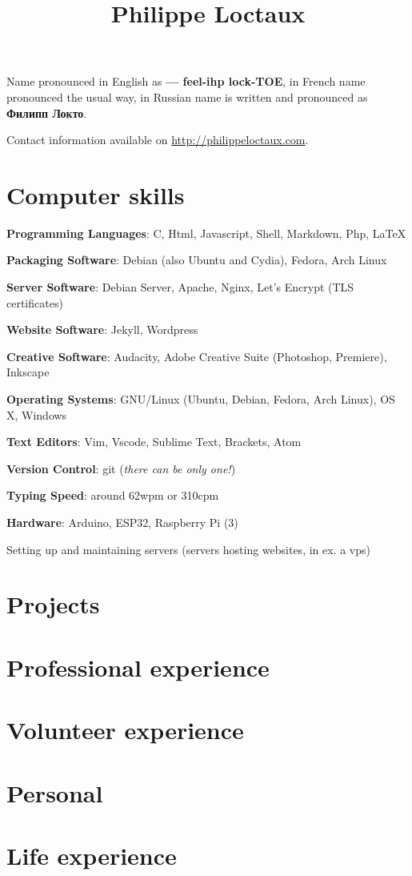 \documentclass[a4paper]{article}
\title{Philippe Loctaux}
\date{\vspace{-5ex}}
\begin{document}
\maketitle

Name pronounced in English as \textbf{ — feel-ihp lock-TOE}, in French name pronounced the usual way, in Russian name is written and pronounced as \textbf{Филипп Локто}.

Contact information available on \url{http://philippeloctaux.com}.

\section*{Computer skills}

\begin{description}
	\item \textbf{Programming Languages}: C, Html, Javascript, Shell, Markdown, Php, \LaTeX
	\item \textbf{Packaging Software}: Debian (also Ubuntu and Cydia), Fedora, Arch Linux
	\item \textbf{Server Software}: Debian Server, Apache, Nginx, Let's Encrypt (TLS certificates)
	\item \textbf{Website Software}: Jekyll, Wordpress
	\item \textbf{Creative Software}: Audacity, Adobe Creative Suite (Photoshop, Premiere), Inkscape
	\item \textbf{Operating Systems}: GNU/Linux (Ubuntu, Debian, Fedora, Arch Linux), OS X, Windows
	\item \textbf{Text Editors}: Vim, Vscode, Sublime Text, Brackets, Atom
	\item \textbf{Version Control}: git (\textit{there can be only one!})
	\item \textbf{Typing Speed}: around 62wpm or 310cpm
	\item \textbf{Hardware}: Arduino, ESP32, Raspberry Pi (3)
	\item Setting up and maintaining servers (servers hosting websites, in ex. a vps)
\end{description}

\section*{Projects}
\section*{Professional experience}
\section*{Volunteer experience}
\section*{Personal}
\section*{Life experience}
\end{document}
